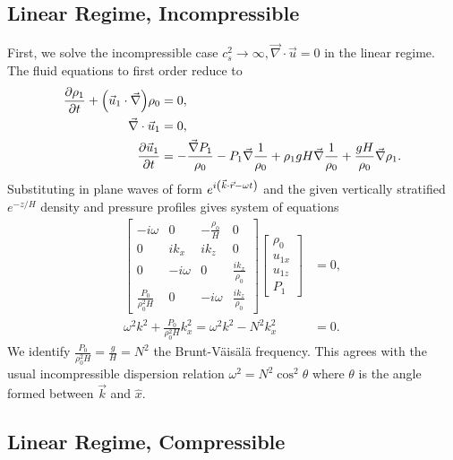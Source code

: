 \documentclass[11pt,
        usenames, %
        dvipsnames %
    ]{report}
\newcommand*{\pd}[2]{\frac{\partial#1}{\partial#2}}
\DeclarePairedDelimiter\p{\lparen}{\rparen}
\begin{document}
\subsection{Linear Regime, Incompressible}

First, we solve the incompressible case $c_s^2 \to \infty, \vec{\nabla} \cdot
\vec{u} = 0$ in the linear regime. The fluid equations to first order reduce to
\begin{equation}
    \begin{split}
        \pd{\rho_1}{t} + \p*{\vec{u}_1 \cdot \vec{\nabla}}\rho_0 &= 0,\\
        \vec{\nabla} \cdot \vec{u}_1 &= 0,\\
        \pd{\vec{u}_1}{t} &= -\frac{\vec{\nabla}P_1}{\rho_0}
            - P_1 \vec{\nabla}\frac{1}{\rho_0}
            + \rho_1 gH \vec{\nabla}\frac{1}{\rho_0}
            + \frac{gH}{\rho_0} \vec{\nabla}\rho_1.
    \end{split}\label{eq:lin_incomp}
\end{equation}
Substituting in plane waves of form $e^{i\p*{\vec{k} \cdot \vec{r} - \omega t}}$
and the given vertically stratified $e^{-z/H}$ density and pressure profiles
gives system of equations
\begin{align}
    \begin{bmatrix}
        -i\omega & 0 & -\frac{\rho_0}{H} & 0\\
        0 & ik_x & ik_z & 0\\
        0 & -i\omega & 0 & \frac{ik_x}{\rho_0}\\
        \frac{P_0}{\rho_0^2H} & 0 & -i\omega & \frac{ik_z}{\rho_0}
    \end{bmatrix}\begin{bmatrix}
        \rho_0 \\ u_{1x} \\ u_{1z} \\ P_1
    \end{bmatrix} &= 0,\nonumber\\
    \omega^2 k^2 + \frac{P_0}{\rho_0^2H}k_x^2 = \omega^2k^2 - N^2k_x^2 &= 0.
\end{align}
We identify $\frac{P_0}{\rho_0^2H} = \frac{g}{H} = N^2$ the Brunt-V\"ais\"al\"a
frequency. This agrees with the usual incompressible dispersion relation
$\omega^2 = N^2\cos^2\theta$ where $\theta$ is the angle formed between
$\vec{k}$ and $\hat{x}$.

\subsection{Linear Regime, Compressible}
\end{document}
